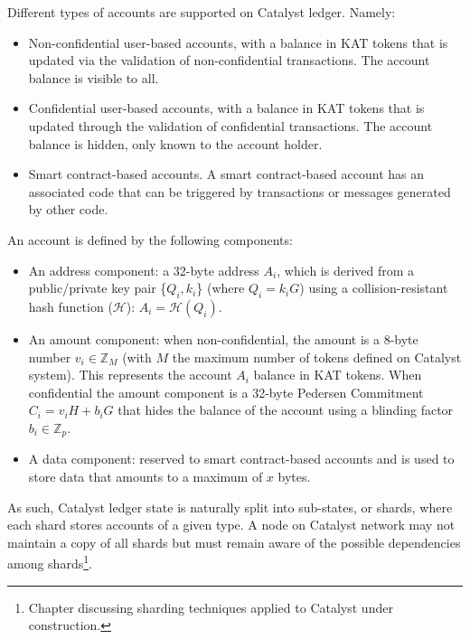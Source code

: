 Different types of accounts  are supported on Catalyst ledger. Namely:

\begin{itemize}
\item Non-confidential user-based accounts, with a balance in KAT tokens that is updated via the validation of non-confidential transactions. The account balance is visible to all.
\item Confidential user-based accounts, with a balance in KAT tokens that is updated through the validation of confidential transactions. The account balance is hidden, only known to the account holder.
\item Smart contract-based accounts. A smart contract-based account has an associated code that can be triggered by transactions or messages generated by other code.
\end{itemize}

An account is defined by the following components: 

\begin{itemize}
\item An address component: a 32-byte address $A_{i}$, which is derived from a public/private key pair \{$Q_{i},k_{i}$\} (where $Q_i= k_{i}G$) using a collision-resistant hash function ($\mathcal{H}$): $A_{i} = \mathcal{H}(Q_{i})$.
\item An amount component: when non-confidential, the amount is a 8-byte number $v_{i} \in \mathbb{Z}_M$ (with $M$ the maximum number of tokens defined on Catalyst system). This represents the account $A_{i}$ balance in KAT tokens. When confidential the amount component is a 32-byte Pedersen Commitment~\cite{confidential} $C_{i} = v_{i}H + b_{i}G$ that hides the balance of the account using a blinding factor $b_{i} \in  \mathbb{Z}_p$.
\item A data component: reserved to smart contract-based accounts and is used to store data that amounts to a maximum of $x$ bytes. 
\end{itemize}

As such, Catalyst ledger state is naturally split into sub-states, or shards, where each shard stores accounts of a given type. A node on Catalyst network may not maintain a copy of all shards but must remain aware of the possible dependencies among shards\footnote{Chapter discussing sharding techniques applied to Catalyst under construction.}.%